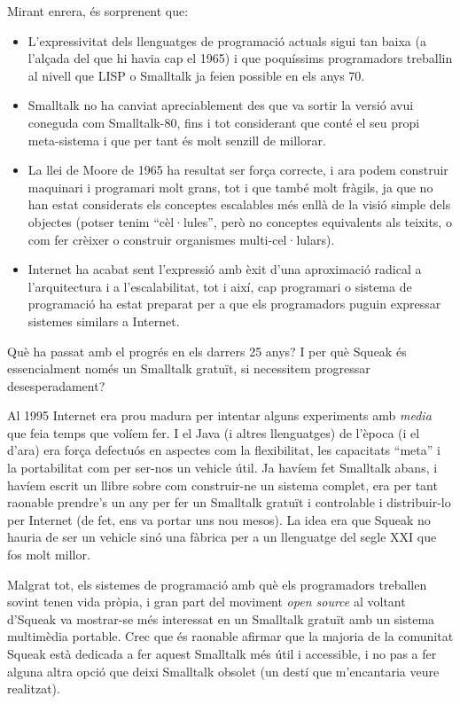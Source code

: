 Mirant enrera, és sorprenent que:
\begin{itemize}
\item L'expressivitat dels llenguatges de programació actuals sigui tan baixa (a l'alçada del que hi havia cap el 1965) i que poquíssims programadors treballin al nivell que LISP o Smalltalk ja feien possible en els anys 70.
\item Smalltalk no ha canviat apreciablement des que va sortir la versió avui coneguda com Smalltalk-80, fins i tot considerant que conté el seu propi meta-sistema i que per tant és molt senzill de millorar.
\item La llei de Moore de 1965 ha resultat ser força correcte, i ara podem construir maquinari i programari molt grans, tot i que també molt fràgils, ja que no han estat considerats els conceptes escalables més enllà de la visió simple dels objectes (potser tenim ``cèl·lules'', però no conceptes equivalents als teixits, o com fer crèixer o construir organismes multi-cel·lulars).
\item Internet ha acabat sent l'expressió amb èxit d'una aproximació radical a l'arquitectura i a l'escalabilitat, tot i així, cap programari o sistema de programació ha estat preparat per a que els programadors puguin expressar sistemes similars a Internet.
\end{itemize}

Què ha passat amb el progrés en els darrers 25 anys? I per què Squeak és essencialment només un Smalltalk gratuït, si necessitem progressar desesperadament?

Al 1995 Internet era prou madura per intentar alguns experiments amb \emph{media} que feia temps que volíem fer. I el Java (i altres llenguatges) de l'època (i el d'ara) era força defectuós en aspectes com la flexibilitat, les capacitats ``meta''  i la portabilitat com per ser-nos un vehicle útil. Ja havíem fet Smalltalk abans, i havíem escrit un llibre sobre com construir-ne un sistema complet, era per tant raonable prendre's un any per fer un Smalltalk gratuït i controlable i distribuir-lo per Internet (de fet, ens va portar uns nou mesos). La idea era que Squeak no hauria de ser un vehicle sinó una fàbrica per a un llenguatge del segle XXI que fos molt millor.

Malgrat tot, els sistemes de programació amb què els programadors treballen sovint tenen vida pròpia, i gran part del moviment \emph{open source} al voltant d'Squeak va mostrar-se més interessat en un Smalltalk gratuït amb un sistema multimèdia portable. Crec que és raonable afirmar que la majoria de la comunitat Squeak està dedicada a fer aquest Smalltalk més útil i accessible, i no pas a fer alguna altra opció que deixi Smalltalk obsolet (un destí que m'encantaria veure realitzat).

